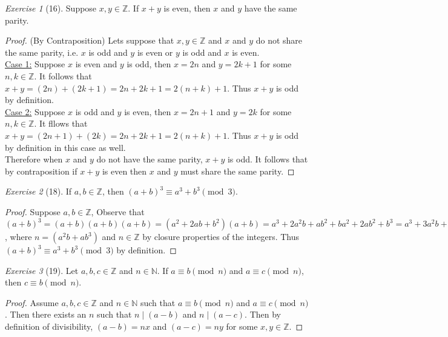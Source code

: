 \documentclass[12pt]{amsart}
\theoremstyle{remark}
\newtheorem*{exercise}{Exercise}%
\def\NN{\ensuremath{\mathbb N}}
\def\ZZ{\ensuremath{\mathbb Z}}
\theoremstyle{mycomment}
\begin{document}
\begin{exercise}[16] Suppose $x,y\in\ZZ$. If $x+y$ is even, then $x$ and $y$ have the same parity.
\begin{proof}
	(By Contraposition) Lets suppose that $x,y\in\ZZ$ and $x$ and $y$ do not share the same parity, i.e. $x$ is odd and $y$ is even or $y$ is odd and $x$ is even. \\
\underline{Case 1:} Suppose $x$ is even and $y$ is odd, then $x=2n$ and $y = 2k+1$ for some $n,k\in\ZZ$. It follows that $x + y = (2n) + (2k+1) = 2n + 2k + 1 = 2(n+k)+1$. Thus $x+y$ is odd by definition. \\
\underline{Case 2:} Suppose $x$ is odd and $y$ is even, then $x = 2n+1$ and $y = 2k$ for some $n,k\in\ZZ$. It fllows that $x + y = (2n+1) + (2k) = 2n + 2k + 1 = 2(n + k) + 1$. Thus $x + y$ is odd by definition in this case as well. \\
Therefore when $x$ and $y$ do not have the same parity, $x+y$ is odd. It follows that by contraposition if $x+y$ is even then $x$ and $y$ must share the same parity.
\end{proof}
\end{exercise}

\begin{exercise}[18] If $a,b\in\ZZ$, then $(a+b)^{3}\equiv a^{3}+b^{3}\pmod 3$. %
\begin{proof}
	Suppose $a,b\in\ZZ$, Observe that $(a+b)^3 = (a+b)(a+b)(a+b) = (a^2 + 2ab + b^2)(a+b) = a^3 + 2a^2b + ab^2 + ba^2 + 2ab^2 + b^3 = a^3 + 3a^2b  + 3ab^2 + b^3 = a^3 + b^3 + 3(a^2b + ab^2) = a^3 + b^3 + 3n$, where $n = (a^2b + ab^3)$ and $n \in \ZZ$ by closure properties of the integers. Thus $(a+b)^{3}\equiv a^{3}+b^{3}\pmod 3$ by definition.
\end{proof}
\end{exercise}

\begin{exercise}[19] Let $a,b,c\in\ZZ$ and $n\in\NN$. If $a\equiv b\pmod n$ and $a\equiv c\pmod n$, then $c\equiv b\pmod n$.
\begin{proof}
	Assume $a, b, c \in \ZZ$ and $n\in\NN$ such that $a\equiv b \pmod n$ and $a\equiv c\pmod n$. Then there exists an $n$ such that $n \mid (a - b)$ and $n \mid (a - c)$. Then by definition of divisibility, $(a-b) = nx$ and $(a-c) = ny$ for some $x,y \in \ZZ$.
\end{proof}
\end{exercise}
\end{document}
